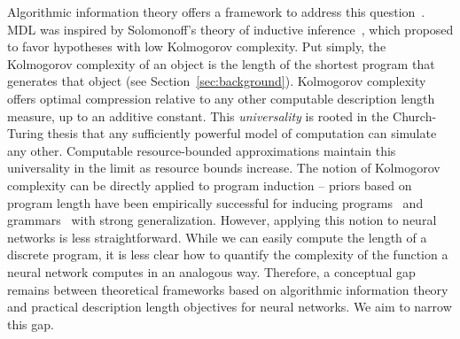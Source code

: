 Algorithmic information theory offers a framework to address this question~\citep{li2008introduction,hutter2005universal,schmidhuber1997discovering}. MDL was inspired by Solomonoff's theory of inductive inference~\citep{solomonoff1964formal}, which proposed to favor hypotheses with low Kolmogorov complexity. Put simply, the Kolmogorov complexity of an object is the length of the shortest program that generates that object (see Section~\ref{sec:background}). Kolmogorov complexity offers optimal compression relative to any other computable description length measure, up to an additive constant. This \emph{universality} is rooted in the Church-Turing thesis that any sufficiently powerful model of computation can simulate any other. Computable resource-bounded approximations maintain this universality in the limit as resource bounds increase. The notion of Kolmogorov complexity can be directly applied to program induction -- priors based on program length have been empirically successful for inducing programs~\cite[e.g.,][]{romera2024mathematical} and grammars~\cite[e.g.,][]{shaw2021compositional} with strong generalization. However, applying this notion to neural networks is less straightforward. While we can easily compute the length of a discrete program, it is less clear how to quantify the complexity of the function a neural network computes in an analogous way. Therefore, a conceptual gap remains between theoretical frameworks based on algorithmic information theory and practical description length objectives for neural networks. We aim to narrow this gap. 

